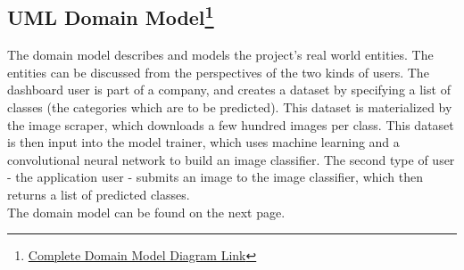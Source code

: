 \documentclass[a4paper, 11pt]{article}
\begin{document}
\subsection{UML Domain Model\protect\footnote{\href{https://drive.google.com/file/d/1LH17gMm1LskQkoO_7QEn8iQRw6mYI1KG/view?usp=sharing}{Complete Domain Model Diagram Link}}}
The domain model describes and models the project's real world entities. The entities can be discussed from the perspectives of the two kinds of users. The dashboard user is part of a company, and creates a dataset by specifying a list of classes (the categories which are to be predicted). This dataset is materialized by the image scraper, which downloads a few hundred images per class. This dataset is then input into the model trainer, which uses machine learning and a convolutional neural network to build an image classifier. The second type of user - the application user - submits an image to the image classifier, which then returns a list of predicted classes.\\
The domain model can be found on the next page.
\begin{center}
\end{center}
\pagebreak
\end{document}
